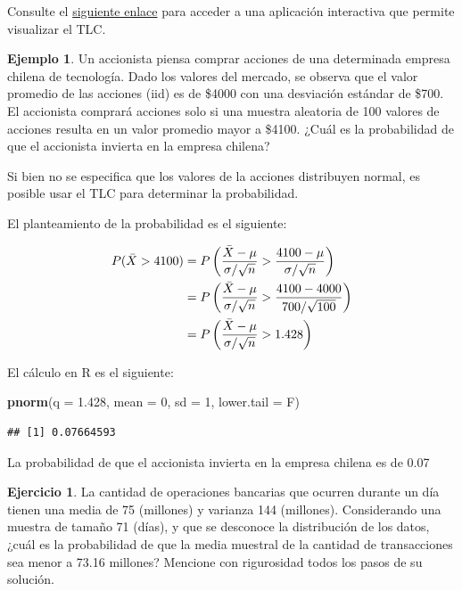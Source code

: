 \documentclass[
  11pt,
]{book}
\newenvironment{Shaded}{\begin{snugshade}}{\end{snugshade}}
\newcommand{\AttributeTok}[1]{\textcolor[rgb]{0.13,0.29,0.53}{#1}}
\newcommand{\DecValTok}[1]{\textcolor[rgb]{0.00,0.00,0.81}{#1}}
\newcommand{\FloatTok}[1]{\textcolor[rgb]{0.00,0.00,0.81}{#1}}
\newcommand{\FunctionTok}[1]{\textcolor[rgb]{0.13,0.29,0.53}{\textbf{#1}}}
\newcommand{\NormalTok}[1]{#1}
\theoremstyle{definition}
\theoremstyle{definition}
\newtheorem{example}{Ejemplo}[chapter]
\theoremstyle{definition}
\newtheorem{exercise}{Ejercicio}[chapter]
\theoremstyle{definition}
\theoremstyle{remark}
\begin{document}
Consulte el \href{https://dfranzani.github.io/App_Estadistica/}{siguiente enlace} para acceder a una aplicación interactiva que permite visualizar el TLC.

\begin{example}
Un accionista piensa comprar acciones de una determinada empresa chilena de tecnología. Dado los valores del mercado, se observa que el valor promedio de las acciones (iid) es de \$4000 con una desviación estándar de \$700. El accionista comprará acciones solo si una muestra aleatoria de 100 valores de acciones resulta en un valor promedio mayor a \$4100. ¿Cuál es la probabilidad de que el accionista invierta en la empresa chilena?

Si bien no se especifica que los valores de la acciones distribuyen normal, es posible usar el TLC para determinar la probabilidad.

El planteamiento de la probabilidad es el siguiente:

\begin{equation}
\notag
\begin{split}
P(\bar{X} > 4100) &= P\left(\frac{\bar{X}-\mu}{\sigma/\sqrt{n}} > \frac{4100-\mu}{\sigma/\sqrt{n}}\right)\\
&= P\left(\frac{\bar{X}-\mu}{\sigma/\sqrt{n}} > \frac{4100 - 4000}{700/\sqrt{100}}\right)\\
&= P\left(\frac{\bar{X}-\mu}{\sigma/\sqrt{n}} > 1.428\right)\\
\end{split}
\end{equation}

El cálculo en R es el siguiente:

\begin{Shaded}
\begin{Highlighting}[]
\FunctionTok{pnorm}\NormalTok{(}\AttributeTok{q =} \FloatTok{1.428}\NormalTok{, }\AttributeTok{mean =} \DecValTok{0}\NormalTok{, }\AttributeTok{sd =} \DecValTok{1}\NormalTok{, }\AttributeTok{lower.tail =}\NormalTok{ F)}
\end{Highlighting}
\end{Shaded}

\begin{verbatim}
## [1] 0.07664593
\end{verbatim}

La probabilidad de que el accionista invierta en la empresa chilena es de 0.07
\end{example}

\begin{exercise}
La cantidad de operaciones bancarias que ocurren durante un día tienen una media de 75 (millones) y varianza 144 (millones). Considerando una muestra de tamaño 71 (días), y que se desconoce la distribución de los datos, ¿cuál es la probabilidad de que la media muestral de la cantidad de transacciones sea menor a 73.16 millones? Mencione con rigurosidad todos los pasos de su solución.
\end{exercise}
\end{document}
